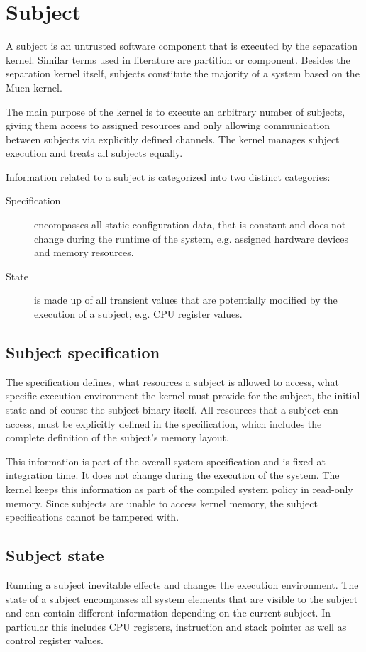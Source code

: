 \section{Subject}\label{sec:subject}
A subject is an untrusted software component that is executed by the separation
kernel. Similar terms used in literature are partition or component. Besides the
separation kernel itself, subjects constitute the majority of a system based on
the Muen kernel.

The main purpose of the kernel is to execute an arbitrary number of subjects,
giving them access to assigned resources and only allowing communication between
subjects via explicitly defined channels. The kernel manages subject execution
and treats all subjects equally.

Information related to a subject is categorized into two distinct categories:

\begin{description}
	\item[Specification] encompasses all static configuration data, that is
		constant and does not change during the runtime of the system, e.g.
		assigned hardware devices and memory resources.
	\item[State] is made up of all transient values that are potentially
		modified by the execution of a subject, e.g. CPU register values.
\end{description}

\subsection{Subject specification}
The specification defines, what resources a subject is allowed to access, what
specific execution environment the kernel must provide for the subject, the
initial state and of course the subject binary itself. All resources that a
subject can access, must be explicitly defined in the specification, which
includes the complete definition of the subject's memory layout.

This information is part of the overall system specification and is fixed at
integration time. It does not change during the execution of the system. The
kernel keeps this information as part of the compiled system policy in read-only
memory. Since subjects are unable to access kernel memory, the subject
specifications cannot be tampered with.

\subsection{Subject state}
Running a subject inevitable effects and changes the execution environment. The
state of a subject encompasses all system elements that are visible to the
subject and can contain different information depending on the current subject.
In particular this includes CPU registers, instruction and stack pointer as well
as control register values.

